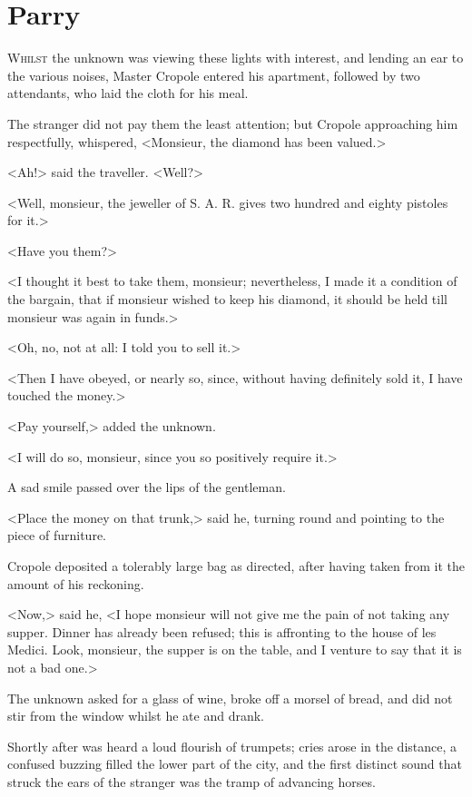 \chapter{Parry}

\lettrine{W}{hilst} the unknown was viewing these lights with interest, and lending an ear to the various noises, Master Cropole entered his apartment, followed by two attendants, who laid the cloth for his meal.

\zz
The stranger did not pay them the least attention; but Cropole approaching him respectfully, whispered, <Monsieur, the diamond has been valued.>

<Ah!> said the traveller. <Well?>

<Well, monsieur, the jeweller of S. A. R. gives two hundred and eighty pistoles for it.>

<Have you them?>

<I thought it best to take them, monsieur; nevertheless, I made it a condition of the bargain, that if monsieur wished to keep his diamond, it should be held till monsieur was again in funds.>

<Oh, no, not at all: I told you to sell it.>

<Then I have obeyed, or nearly so, since, without having definitely sold it, I have touched the money.>

<Pay yourself,> added the unknown.

<I will do so, monsieur, since you so positively require it.>

A sad smile passed over the lips of the gentleman.

<Place the money on that trunk,> said he, turning round and pointing to the piece of furniture.

Cropole deposited a tolerably large bag as directed, after having taken from it the amount of his reckoning.

<Now,> said he, <I hope monsieur will not give me the pain of not taking any supper. Dinner has already been refused; this is affronting to the house of les Medici. Look, monsieur, the supper is on the table, and I venture to say that it is not a bad one.>

The unknown asked for a glass of wine, broke off a morsel of bread, and did not stir from the window whilst he ate and drank.

Shortly after was heard a loud flourish of trumpets; cries arose in the distance, a confused buzzing filled the lower part of the city, and the first distinct sound that struck the ears of the stranger was the tramp of advancing horses.


